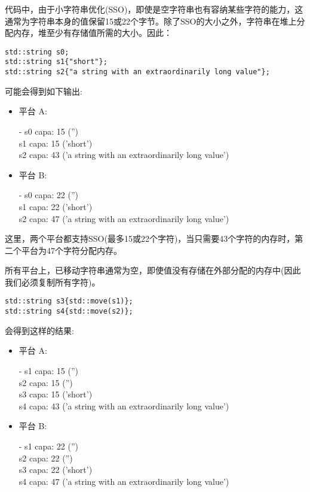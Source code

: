 代码中，由于小字符串优化(SSO)，即使是空字符串也有容纳某些字符的能力，这通常为字符串本身的值保留15或22个字节。除了SSO的大小之外，字符串在堆上分配内存，堆至少有存储值所需的大小。因此：\par

\begin{lstlisting}[caption={}]
std::string s0;
std::string s1{"short"};
std::string s2{"a string with an extraordinarily long value"};
\end{lstlisting}

可能会得到如下输出:\par

\begin{itemize}
	\item 平台 A:
	\begin{tcolorbox}[colback=white,colframe=black]
	- s0 capa: 15 ('') \\
	s1 capa: 15 ('short') \\
	s2 capa: 43 ('a string with an extraordinarily long value')
	\end{tcolorbox}	
	\item 平台 B:
	\begin{tcolorbox}[colback=white,colframe=black]
	- s0 capa: 22 ('') \\
	s1 capa: 22 ('short') \\
	s2 capa: 47 ('a string with an extraordinarily long value')
	\end{tcolorbox}	
\end{itemize}

这里，两个平台都支持SSO(最多15或22个字符)，当只需要43个字符的内存时，第二个平台为47个字符分配内存。\par

所有平台上，已移动字符串通常为空，即使值没有存储在外部分配的内存中(因此我们必须复制所有字符)。\par

\begin{lstlisting}[caption={}]
std::string s3{std::move(s1)};
std::string s4{std::move(s2)};
\end{lstlisting}

会得到这样的结果:\par

\begin{itemize}
	\item 平台 A:
	\begin{tcolorbox}[colback=white,colframe=black]
	- s1 capa: 15 ('') \\
	s2 capa: 15 ('') \\
	s3 capa: 15 ('short') \\
	s4 capa: 43 ('a string with an extraordinarily long value')
	\end{tcolorbox}	
	\item 平台 B:
	\begin{tcolorbox}[colback=white,colframe=black]
	- s1 capa: 22 ('') \\
	s2 capa: 22 ('') \\
	s3 capa: 22 ('short') \\
	s4 capa: 47 ('a string with an extraordinarily long value')
	\end{tcolorbox}	
\end{itemize}

